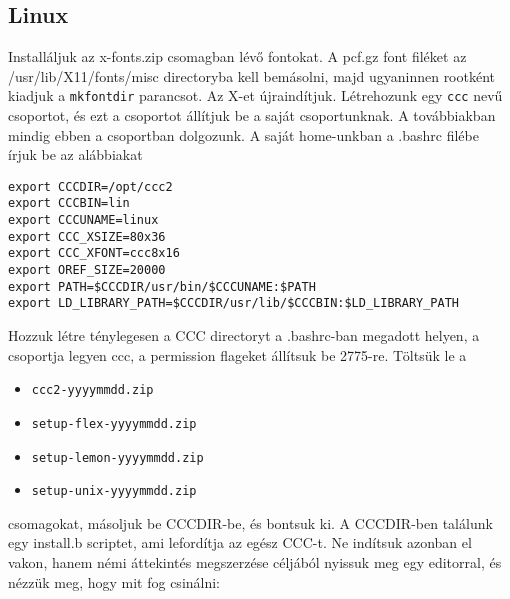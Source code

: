 \subsection{Linux}

Installáljuk az x-fonts.zip csomagban lévő fontokat.
A pcf.gz  font filéket az /usr/lib/X11/fonts/misc directoryba 
kell bemásolni, majd ugyaninnen rootként kiadjuk a \verb!mkfontdir!  
parancsot. Az X-et újraindítjuk.
Létrehozunk egy \verb!ccc! nevű csoportot, és ezt a csoportot
állítjuk be a saját csoportunknak. A továbbiakban mindig
ebben a csoportban dolgozunk.
A saját home-unkban a .bashrc filébe írjuk be az alábbiakat
\begin{verbatim}
export CCCDIR=/opt/ccc2
export CCCBIN=lin
export CCCUNAME=linux
export CCC_XSIZE=80x36
export CCC_XFONT=ccc8x16
export OREF_SIZE=20000
export PATH=$CCCDIR/usr/bin/$CCCUNAME:$PATH
export LD_LIBRARY_PATH=$CCCDIR/usr/lib/$CCCBIN:$LD_LIBRARY_PATH
\end{verbatim}
 
Hozzuk létre ténylegesen a CCC directoryt  a .bashrc-ban 
megadott helyen, a csoportja legyen ccc,
a permission flageket állítsuk be 2775-re.
Töltsük le a 
\begin{itemize}
\item \tt ccc2-yyyymmdd.zip
\item \tt setup-flex-yyyymmdd.zip
\item \tt setup-lemon-yyyymmdd.zip
\item \tt setup-unix-yyyymmdd.zip
\end{itemize}
csomagokat, másoljuk be CCCDIR-be, és bontsuk ki.
A CCCDIR-ben találunk egy install.b scriptet, ami lefordítja
az egész CCC-t. Ne indítsuk azonban el vakon, hanem némi áttekintés
megszerzése céljából nyissuk meg egy editorral, és nézzük meg, 
hogy mit fog csinálni:
 
